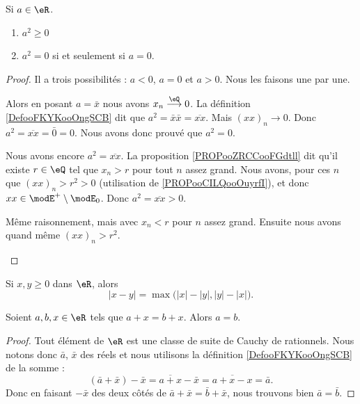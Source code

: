 \begin{lemma}       \label{LEMooNLGSooSGdvAo}
	Si \( a\in \eR\).
	\begin{enumerate}
		\item
		      \( a^2\geq 0\)
		\item
		      \( a^2=0\) si et seulement si \( a=0\).
	\end{enumerate}
\end{lemma}

\begin{proof}
	Il a trois possibilités : \( a<0\), \( a=0\) et \( a>0\). Nous les faisons une par une.
	\begin{subproof}
		\spitem[Si \( a=0\)]
		Alors en posant \( a=\bar x\) nous avons \( x_n\stackrel{ \eQ}{\longrightarrow} 0\). La définition \ref{DefooFKYKooOngSCB} dit que \( a^2=\bar x\bar x=\overline{xx}\). Mais \( (xx)_n\to 0\). Donc \( a^2=\overline{xx}=\bar 0=0\). Nous avons donc prouvé que \( a^2=0\).

		\spitem[Si \( a>0\)]
		Nous avons encore \( a^2=\overline{xx}\). La proposition \ref{PROPooZRCCooFGdtll} dit qu'il existe \( r\in \eQ\) tel que \( x_n>r\) pour tout \( n\) assez grand. Nous avons, pour ces \( n\) que \( (xx)_n>r^2>0\) (utilisation de \ref{PROPooCILQooOuyrfI}), et donc \( xx\in \modE^+\setminus\modE_0\). Donc \( a^2=\overline{xx}>0\).

		\spitem[Si \( a<0\)]
		Même raisonnement, mais avec \( x_n<r\) pour \( n\) assez grand. Ensuite nous avons quand même \( (xx)_n>r^2\).
	\end{subproof}
\end{proof}


\begin{proposition}	\label{PROPooRJOWooGbieCA}
	Si \( x,y\geq 0\) dans \( \eR\), alors
	\begin{equation}
		| x-y |=\max\big( | x |-| y |,| y |-| x | \big).
	\end{equation}
\end{proposition}


\begin{lemma}       \label{LEMooFQMVooDNaTDT}
	Soient \( a,b,x\in \eR\) tels que \( a+x=b+x\). Alors \( a=b\).
\end{lemma}

\begin{proof}
	Tout élément de \( \eR\) est une classe de suite de Cauchy de rationnels. Nous notons donc \( \bar a\), \( \bar x\) des réels et nous utilisons la définition \ref{DefooFKYKooOngSCB} de la somme :
	\begin{equation}
		(\bar a+\bar x)-\bar x=\overline{a+x}-\bar x=\overline{a+x-x}=\bar a.
	\end{equation}
	Donc en faisant \( -\bar x\) des deux côtés de \( \bar a+\bar x=\bar b+\bar x\), nous trouvons bien \( \bar a=\bar b\).
\end{proof}

